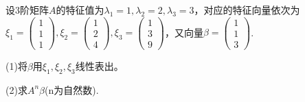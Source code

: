 \documentclass[a4paper]{report}
\begin{document}
\EX 设3阶矩阵$A$的特征值为$\lambda_1=1,\lambda_2=2,\lambda_3=3$，对应的特征向量依次为$
\xi_1=
\begin{pmatrix}
1\\1\\1
\end{pmatrix},\xi_2=
\begin{pmatrix}
1\\2\\4
\end{pmatrix},\xi_3=
\begin{pmatrix}
1\\3\\9
\end{pmatrix}
$，又向量$
\beta=
\begin{pmatrix}
1\\1\\3
\end{pmatrix}
$.

(1)将$\beta$用$\xi_1,\xi_2,\xi_3$线性表出。

(2)求$A^{n}\beta$(n为自然数).
\end{document}
